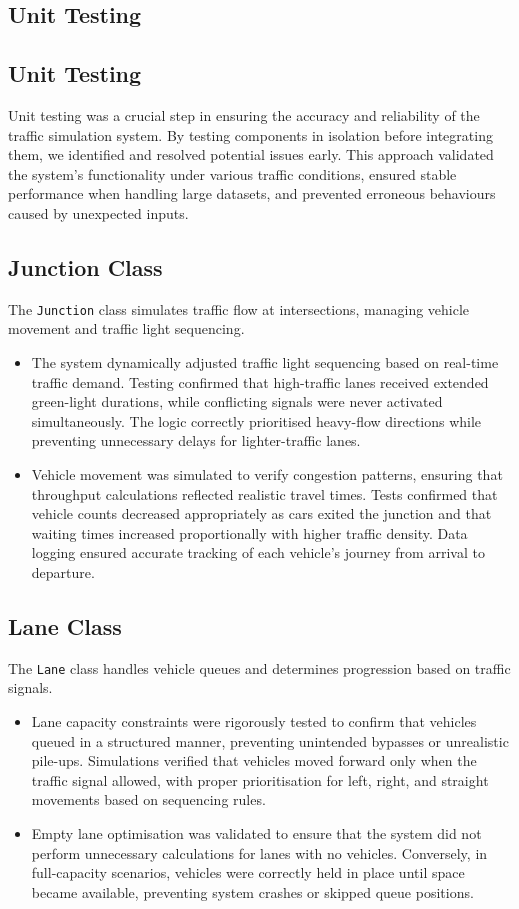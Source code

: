 \documentclass{article}
\begin{document}
    \subsection{Unit Testing}
    \subsection{Unit Testing}
Unit testing was a crucial step in ensuring the accuracy and reliability of the traffic simulation system. By testing components in isolation before integrating them, we identified and resolved potential issues early. This approach validated the system’s functionality under various traffic conditions, ensured stable performance when handling large datasets, and prevented erroneous behaviours caused by unexpected inputs.

\subsection*{Junction Class}
The \texttt{Junction} class simulates traffic flow at intersections, managing vehicle movement and traffic light sequencing.  
\begin{itemize}
    \item The system dynamically adjusted traffic light sequencing based on real-time traffic demand. Testing confirmed that high-traffic lanes received extended green-light durations, while conflicting signals were never activated simultaneously. The logic correctly prioritised heavy-flow directions while preventing unnecessary delays for lighter-traffic lanes.
    \item Vehicle movement was simulated to verify congestion patterns, ensuring that throughput calculations reflected realistic travel times. Tests confirmed that vehicle counts decreased appropriately as cars exited the junction and that waiting times increased proportionally with higher traffic density. Data logging ensured accurate tracking of each vehicle’s journey from arrival to departure.
\end{itemize}

\subsection*{Lane Class}
The \texttt{Lane} class handles vehicle queues and determines progression based on traffic signals.  
\begin{itemize}
    \item Lane capacity constraints were rigorously tested to confirm that vehicles queued in a structured manner, preventing unintended bypasses or unrealistic pile-ups. Simulations verified that vehicles moved forward only when the traffic signal allowed, with proper prioritisation for left, right, and straight movements based on sequencing rules.
    \item Empty lane optimisation was validated to ensure that the system did not perform unnecessary calculations for lanes with no vehicles. Conversely, in full-capacity scenarios, vehicles were correctly held in place until space became available, preventing system crashes or skipped queue positions.
\end{itemize}
\end{document}
